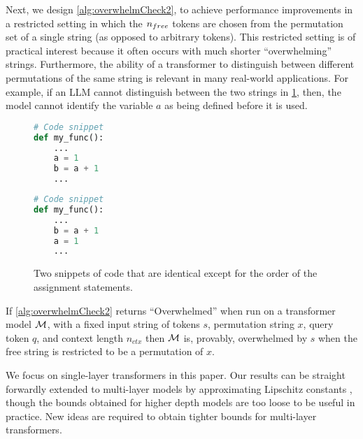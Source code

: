 Next, we design \cref{alg:overwhelmCheck2}, to achieve performance improvements in a restricted setting in which the $n_{free}$ tokens are chosen from the permutation set of a single string (as opposed to arbitrary tokens). This restricted setting is of practical interest because it often occurs with much shorter ``overwhelming'' strings.
Furthermore, the ability of a transformer to distinguish between different permutations of the same string is relevant in many real-world applications.  For example, if an LLM cannot distinguish between the two strings in \cref{fig:perm_example}, then, the model cannot identify the variable $a$ as being defined before it is used.

\begin{figure}[H]
	\centering
	\begin{multicols}{2}
\begin{lstlisting}[language=Python]
# Code snippet
def my_func():
	...
	a = 1
	b = a + 1
	...
	\end{lstlisting}
	\columnbreak
\begin{lstlisting}[language=Python]
# Code snippet
def my_func():
	...
	b = a + 1
	a = 1
	...
\end{lstlisting}
\end{multicols}
\caption{Two snippets of code that are identical except for the order of the assignment statements.}
	\label{fig:perm_example}
\end{figure}

\begin{theorem}
	\label{thm:informal_overwhelm_perm}
	If \cref{alg:overwhelmCheck2} returns ``Overwhelmed'' when run on a  transformer model $\mathcal{M}$, with a fixed input string of tokens $s$, permutation string $x$, query token $q$, and context length $n_{ctx}$ then $\mathcal{M}$ is, provably, overwhelmed by $s$ when the free string is restricted to be a permutation of $x$.
\end{theorem}
\vspace{-0.5em}

We focus on single-layer transformers in this paper. Our results can be straight forwardly extended to multi-layer models by approximating  Lipschitz constants \cite{kim2021lipschitzconstantselfattention}, though the bounds obtained for higher depth models are too loose to be useful in practice. New ideas are required to obtain tighter bounds for multi-layer transformers.

